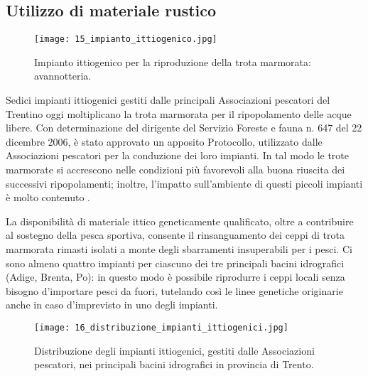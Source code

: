 \documentclass[10pt,twoside,openany,x11names,svgnames,italian,a5paper,dvipsnames,table]{memoir}
\begin{document}
\subsection{Utilizzo di materiale rustico}
\begin{wrapfigure}[16]{r}{.5\textwidth}
\begin{center}
\vspace{-.4cm}
\texttt{[image: 15\_impianto\_ittiogenico.jpg]}
\caption*{Impianto ittiogenico per la riproduzione della trota marmorata: avannotteria.}
\end{center}
\end{wrapfigure}
Sedici impianti ittiogenici gestiti dalle principali Associazioni pescatori del Trentino oggi moltiplicano la trota marmorata per il ripopolamento delle acque libere. Con determinazione del dirigente del Servizio Foreste e fauna  n. 647 del 22 dicembre 2006, è stato approvato un apposito Protocollo, utilizzato dalle Associazioni pescatori per la conduzione dei loro impianti. In tal modo le trote marmorate si accrescono nelle condizioni più favorevoli alla buona riuscita dei successivi ripopolamenti; inoltre, l’impatto sull’ambiente di questi piccoli impianti è molto contenuto \cite{Pontalti09}.


La disponibilità di materiale ittico geneticamente qualificato, oltre a contribuire al sostegno della pesca sportiva, consente il rinsanguamento dei ceppi di trota marmorata rimasti isolati a monte degli sbarramenti insuperabili per i pesci. Ci sono almeno quattro impianti per ciascuno dei tre principali bacini idrografici (Adige, Brenta, Po): in questo modo è possibile riprodurre i ceppi locali senza bisogno d’importare pesci da fuori, tutelando così le linee genetiche originarie anche in caso d’imprevisto in uno degli impianti.

\begin{sidewaysfigure}[H]
\centering
\texttt{[image: 16\_distribuzione\_impianti\_ittiogenici.jpg]}
\caption*{Distribuzione degli impianti ittiogenici, gestiti dalle Associazioni pescatori, nei principali bacini idrografici in provincia di Trento.}
\end{sidewaysfigure}
\end{document}
